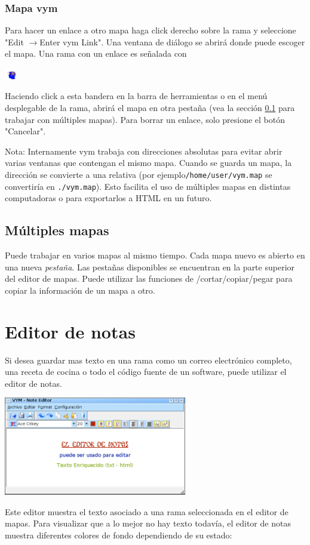 \documentclass{article}
\newcommand{\vym}{{\sc vym }}
\newcommand{\ra}{$\longrightarrow$}
\begin{document}
\subsubsection*{Mapa \vym}
Para hacer un enlace a otro mapa haga click derecho sobre la rama y seleccione "Edit \ra Enter \vym Link". Una ventana de di\'alogo se abrir\'a donde puede escoger el mapa. Una rama con un enlace es se\~nalada con
\begin{center}
    \includegraphics[width=0.5cm]{images/flag-vymlink.png}
\end{center}
Haciendo click a esta bandera en la barra de herramientas  o en el men\'u desplegable de la rama, abrir\'a el mapa en otra pesta\~na (vea la secci\'on \ref{tabs} para trabajar con m\'ultiples mapas). Para borrar un enlace, solo presione el bot\'on "Cancelar".

Nota: Internamente \vym trabaja con direcciones absolutas para evitar abrir varias ventanas que contengan el mismo mapa. Cuando se guarda un mapa, la direcci\'on se convierte a una relativa (por ejemplo{\tt /home/user/vym.map} se convertir\'ia en {\tt ./vym.map}). Esto facilita el uso de m\'ultiples mapas en distintas computadoras o para exportarlos a HTML en un futuro.

\subsection{M\'ultiples mapas} \label{tabs}
Puede trabajar en varios mapas al mismo tiempo. Cada mapa nuevo es abierto en una nueva {\em pesta\~na}. Las pesta\~nas disponibles se encuentran en la parte superior del editor de mapas. Puede utilizar las funciones de /cortar/copiar/pegar para copiar la informaci\'on de un mapa a otro.

\section{Editor de notas} \label {noteeditor}
Si desea guardar mas texto en una rama como un correo electr\'onico completo, una receta de cocina o todo el c\'odigo fuente de un software, puede utilizar el editor de notas.
\begin{center}
    \includegraphics[width=8cm]{images/noteeditor_es.png}
\end{center}
Este editor muestra el texto asociado a una rama seleccionada en el editor de mapas. Para visualizar que a lo mejor no hay texto todav\'ia, el editor de notas  muestra diferentes colores de fondo dependiendo de su estado:
\end{document}
